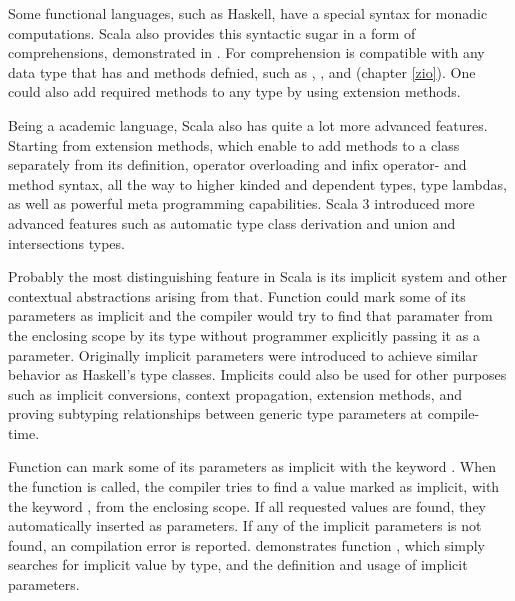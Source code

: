 

Some functional languages, such as Haskell, have a special syntax for monadic computations. Scala also provides this syntactic sugar in a form of  comprehensions, demonstrated in . For comprehension is compatible with any data type that has  and  methods defnied, such as , , and  (chapter \ref{zio}). One could also add required methods to any type by using extension methods.

Being a academic language, Scala also has quite a lot more advanced features. Starting from extension methods, which enable to add methods to a class separately from its definition, operator overloading and infix operator- and method syntax, all the way to higher kinded and dependent types, type lambdas, as well as powerful meta programming capabilities. Scala 3 introduced more advanced features such as automatic type class derivation and union and intersections types.

Probably the most distinguishing feature in Scala is its implicit system and other contextual abstractions arising from that. Function could mark some of its parameters as implicit and the compiler would try to find that paramater from the enclosing scope by its type without programmer explicitly passing it as a parameter. Originally implicit parameters were introduced to achieve similar behavior as Haskell's type classes. Implicits could also be used for other purposes such as implicit conversions, context propagation, extension methods, and proving subtyping relationships between generic type parameters at compile-time.~\cite{tc-as-objects}

Function can mark some of its parameters as implicit with the keyword . When the function is called, the compiler tries to find a value marked as implicit, with the keyword , from the enclosing scope. If all requested values are found, they automatically inserted as parameters. If any of the implicit parameters is not found, an compilation error is reported.  demonstrates function , which simply searches for implicit value by type, and the definition and usage of implicit parameters.



